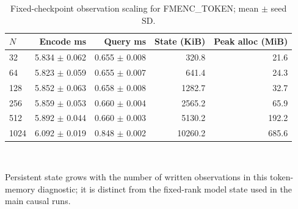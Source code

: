 \begin{table}[t]
\centering
\scriptsize
\caption{Fixed-checkpoint observation scaling for FMENC\_TOKEN; mean $\pm$ seed SD.}
\label{tab:rebuttal-observation}
\begin{tabular}{lrrrr}
\toprule
$N$ & Encode ms & Query ms & State (KiB) & Peak alloc (MiB) \\
\midrule
32 & 5.834 $\pm$ 0.062 & 0.655 $\pm$ 0.008 & 320.8 & 21.6 \\
64 & 5.823 $\pm$ 0.059 & 0.655 $\pm$ 0.007 & 641.4 & 24.3 \\
128 & 5.852 $\pm$ 0.063 & 0.658 $\pm$ 0.008 & 1282.7 & 32.7 \\
256 & 5.859 $\pm$ 0.053 & 0.660 $\pm$ 0.004 & 2565.2 & 65.9 \\
512 & 5.892 $\pm$ 0.044 & 0.660 $\pm$ 0.003 & 5130.2 & 192.2 \\
1024 & 6.092 $\pm$ 0.019 & 0.848 $\pm$ 0.002 & 10260.2 & 685.6 \\
\bottomrule
\end{tabular}
\\[-1mm]
\begin{minipage}{0.96\linewidth}\footnotesize Persistent state grows with the number of written observations in this token-memory diagnostic; it is distinct from the fixed-rank model state used in the main causal runs.\end{minipage}
\end{table}

